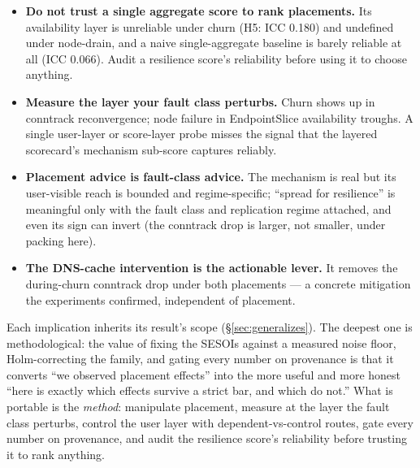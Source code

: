 \begin{itemize}
\item \textbf{Do not trust a single aggregate score to rank placements.} Its
  availability layer is unreliable under churn (H5: ICC 0.180) and undefined
  under node-drain, and a naive single-aggregate baseline is barely reliable at
  all (ICC 0.066). Audit a resilience score's reliability before using it to
  choose anything.
\item \textbf{Measure the layer your fault class perturbs.} Churn shows up in
  conntrack reconvergence; node failure in EndpointSlice availability troughs. A
  single user-layer or score-layer probe misses the signal that the layered
  scorecard's mechanism sub-score captures reliably.
\item \textbf{Placement advice is fault-class advice.} The mechanism is real but
  its user-visible reach is bounded and regime-specific; ``spread for
  resilience'' is meaningful only with the fault class and replication regime
  attached, and even its sign can invert (the conntrack drop is larger, not
  smaller, under packing here).
\item \textbf{The DNS-cache intervention is the actionable lever.} It removes the
  during-churn conntrack drop under both placements --- a concrete mitigation
  the experiments confirmed, independent of placement.
\end{itemize}

Each implication inherits its result's scope (\S\ref{sec:generalizes}). The
deepest one is methodological: the value of
fixing the SESOIs against a measured noise floor, Holm-correcting the family,
and gating every number on provenance is that it converts ``we observed
placement effects'' into the more useful and more honest ``here is exactly which
effects survive a strict bar, and which do not.'' What is portable is the \emph{method}: manipulate placement, measure at
the layer the fault class perturbs, control the user layer with
dependent-vs-control routes, gate every number on provenance, and audit the
resilience score's reliability before trusting it to rank anything.
